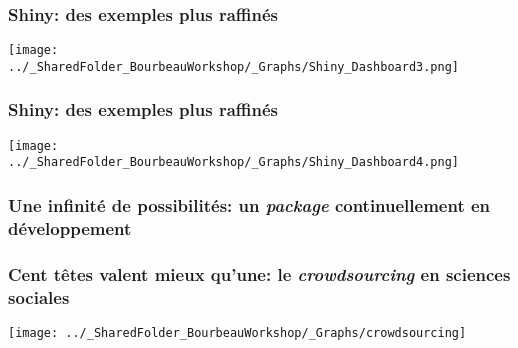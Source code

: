 \documentclass{beamer}
\begin{document}
    

    \begin{frame}
    
      \frametitle{Shiny: des exemples plus raffinés} \vspace{1cm}
      
        \begin{center}
      	  \texttt{[image: ../\_SharedFolder\_BourbeauWorkshop/\_Graphs/Shiny\_Dashboard3.png]}
        \end{center} 
      
          
    \end{frame}  
    
    

    \begin{frame}
    
      \frametitle{Shiny: des exemples plus raffinés} \vspace{1cm}
      
        \begin{center}
      	  \texttt{[image: ../\_SharedFolder\_BourbeauWorkshop/\_Graphs/Shiny\_Dashboard4.png]}
        \end{center} 
      
          
    \end{frame}  
    


    \begin{frame}
    
        \frametitle{Une infinité de possibilités: un \emph{package} continuellement en développement} \vspace{1cm}
    
    \end{frame}
    
    
    
     \begin{frame}
	        \frametitle{Cent têtes valent mieux qu’une: le \emph{crowdsourcing} en sciences sociales} \vspace{1cm}   
	        \begin{center}
	           \texttt{[image: ../\_SharedFolder\_BourbeauWorkshop/\_Graphs/crowdsourcing]}
	        \end{center}  
	    \end{frame}
    
   
\end{document}
